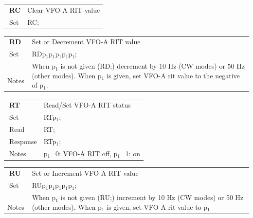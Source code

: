 \documentclass[12pt]{book}
\begin{document}
\begin{center}
\begin{tabular}{|p{2cm}|p{11cm}|}
\toprule
$\phantom{\Big|}$\textbf{\large RC} & Clear VFO-A RIT value \\\cline{1-2}
$\phantom{\Big|}${\large Set} & {RC;} \\\hline
\bottomrule
\end{tabular}
\end{center}

\begin{center}
\begin{tabular}{|p{2cm}|p{11cm}|}
\toprule
$\phantom{\Big|}$\textbf{\large RD} & Set or Decrement VFO-A RIT value \\\cline{1-2}
$\phantom{\Big|}${\large Set} & {RDp$_1$p$_1$p$_1$p$_1$p$_1$;} \\\hline
$\phantom{\Big|}${\large Notes} & \multicolumn{1}{|p{11cm}|}{When p$_1$ is not given (RD;)  decrement by 10 Hz (CW modes) or 50 Hz (other modes). When p$_1$ is given, set VFO-A rit value to the negative of p$_1$.} \\
\bottomrule
\end{tabular}
\end{center}

\begin{center}
\begin{tabular}{|p{2cm}|p{11cm}|}
\toprule
$\phantom{\Big|}$\textbf{\large RT} & Read/Set VFO-A RIT status \\\cline{1-2}
$\phantom{\Big|}${\large Set} & {RTp$_1$;} \\\hline
$\phantom{\Big|}${\large Read} & {RT;} \\\hline
$\phantom{\Big|}${\large Response} & {RTp$_1$;} \\\hline
$\phantom{\Big|}${\large Notes} & \multicolumn{1}{|p{11cm}|}{p$_1$=0: VFO-A RIT off, p$_1$=1: on} \\
\bottomrule
\end{tabular}
\end{center}

\begin{center}
\begin{tabular}{|p{2cm}|p{11cm}|}
\toprule
$\phantom{\Big|}$\textbf{\large RU} & Set or Increment VFO-A RIT value \\\cline{1-2}
$\phantom{\Big|}${\large Set} & {RUp$_1$p$_1$p$_1$p$_1$p$_1$;} \\\hline
$\phantom{\Big|}${\large Notes} & \multicolumn{1}{|p{11cm}|}{When p$_1$ is not given (RU;)  increment by 10 Hz (CW modes) or 50 Hz (other modes). When p$_1$ is given, set VFO-A rit value to p$_1$} \\
\bottomrule
\end{tabular}
\end{center}
\end{document}
